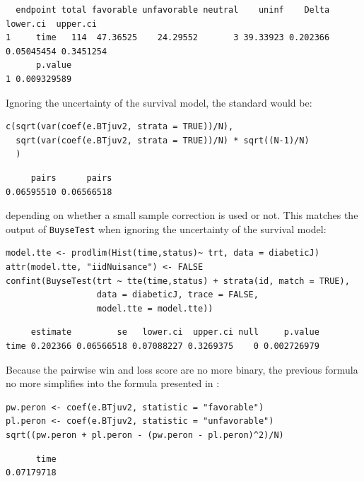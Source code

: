 \documentclass[12pt]{article}
\newcommand\Warning[1][3ex]{%
\renewcommand\stacktype{L}%
\scaleto{\stackon[1.3pt]{\color{red}$\triangle$}{\tiny\bfseries !}}{#1}%
\xspace
}
\begin{document}
\begin{verbatim}
  endpoint total favorable unfavorable neutral    uninf    Delta   lower.ci  upper.ci
1     time   114  47.36525    24.29552       3 39.33923 0.202366 0.05045454 0.3451254
      p.value
1 0.009329589
\end{verbatim}


Ignoring the uncertainty of the survival model, the standard would be:
\lstset{language=r,label= ,caption= ,captionpos=b,numbers=none}
\begin{lstlisting}
c(sqrt(var(coef(e.BTjuv2, strata = TRUE))/N),
  sqrt(var(coef(e.BTjuv2, strata = TRUE))/N) * sqrt((N-1)/N)
  )
\end{lstlisting}

\begin{verbatim}
     pairs      pairs 
0.06595510 0.06566518
\end{verbatim}


depending on whether a small sample correction is used or not. This
matches the output of \texttt{BuyseTest} when ignoring the uncertainty of the
survival model:
\lstset{language=r,label= ,caption= ,captionpos=b,numbers=none}
\begin{lstlisting}
model.tte <- prodlim(Hist(time,status)~ trt, data = diabeticJ)
attr(model.tte, "iidNuisance") <- FALSE
confint(BuyseTest(trt ~ tte(time,status) + strata(id, match = TRUE), 
                  data = diabeticJ, trace = FALSE,
                  model.tte = model.tte))
\end{lstlisting}

\begin{verbatim}
     estimate         se   lower.ci  upper.ci null     p.value
time 0.202366 0.06566518 0.07088227 0.3269375    0 0.002726979
\end{verbatim}


\Warning Because the pairwise win and loss score are no more binary, the
previous formula no more simplifies into the formula presented in
\cite{matsouaka2022robust}:
\lstset{language=r,label= ,caption= ,captionpos=b,numbers=none}
\begin{lstlisting}
pw.peron <- coef(e.BTjuv2, statistic = "favorable")
pl.peron <- coef(e.BTjuv2, statistic = "unfavorable")
sqrt((pw.peron + pl.peron - (pw.peron - pl.peron)^2)/N)
\end{lstlisting}

\begin{verbatim}
      time 
0.07179718
\end{verbatim}
\end{document}
